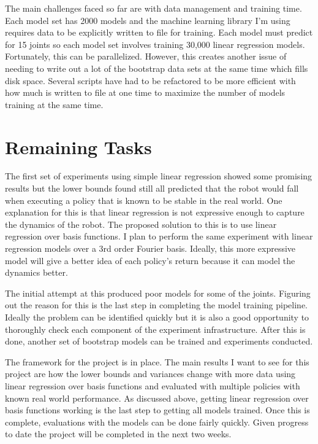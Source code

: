 \documentclass[12 pt]{article}
\begin{document}
The main challenges faced so far are with data management and training time. Each model set has 2000 models and the machine learning library I'm using requires data to be explicitly written to file for training. Each model must predict for 15 joints so each model set involves training 30,000 linear regression models. Fortunately, this can be parallelized. However, this creates another issue of needing to write out a lot of the bootstrap data sets at the same time which fills disk space. Several scripts have had to be refactored to be more efficient with how much is written to file at one time to maximize the number of models training at the same time.

\section{Remaining Tasks}
The first set of experiments using simple linear regression showed some promising results but the lower bounds found still all predicted that the robot would fall when executing a policy that is known to be stable in the real world. One explanation for this is that linear regression is not expressive enough to capture the dynamics of the robot. The proposed solution to this is to use linear regression over basis functions. I plan to perform the same experiment with linear regression models over a 3rd order Fourier basis. Ideally, this more expressive model will give a better idea of each policy's return because it can model the dynamics better.

The initial attempt at this produced poor models for some of the joints. Figuring out the reason for this is the last step in completing the model training pipeline. Ideally the problem can be identified quickly but it is also a good opportunity to thoroughly check each component of the experiment infrastructure. After this is done, another set of bootstrap models can be trained and experiments conducted.

The framework for the project is in place. The main results I want to see for this project are how the lower bounds and variances change with more data using linear regression over basis functions and evaluated with multiple policies with known real world performance.
As discussed above, getting linear regression over basis functions working is the last step to getting all models trained. Once this is complete, evaluations with the models can be done fairly quickly. Given progress to date the project will be completed in the next two weeks.



\end{document}
